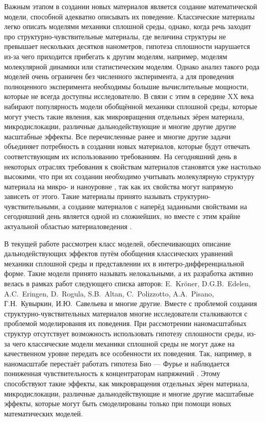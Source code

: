 \ifsynopsis
Важным этапом в создании новых материалов является создание математической модели, способной адекватно описывать их поведение. Классические материалы легко описать моделями механики сплошной среды, однако, когда речь заходит про структурно-чувствительные материалы, где величина структуры не превышает нескольких десятков нанометров, гипотеза сплошности нарушается из-за чего приходится прибегать к другим моделям, например, моделям молекулярной динамики или статистическим моделям. Однако анализ такого рода моделей очень ограничен без численного эксперимента, а для проведения полноценного эксперимента необходимы большие вычислительные мощности, которые не всегда доступны исследователю. В связи с этим в середине XX века набирают популярность модели обобщённой механики сплошной среды, которые могут учесть такие явления, как микровращения отдельных зёрен материала, микродислокации, различные дальнодействующие и многие другие другие масштабные эффекты.
\else
Все перечисленные ранее и многие другие задачи объединяет потребность в создании новых материалов, которые будут отвечать соответствующим их использованию требованиям. На сегодняшний день в некоторых отраслях требования к свойствам материалов становятся уже настолько высокими, что при их создании необходимо учитывать молекулярную структуру материала на микро- и наноуровне \cite{MaterialStructure1, MaterialStructure2, MaterialStructure3}, так как их свойства могут напрямую зависеть от этого. Такие материалы принято называть структурно-чувствительными, а создание материалов с наперёд заданными свойствами на сегодняшний день является одной из сложнейших, но вместе с этим крайне актуальной областью материаловедения \cite{Auxetics}.
\fi

\ifsynopsis
В текущей работе рассмотрен класс моделей, обеспечивающих описание дальнодействующих эффектов путём обобщения классических уравнений механики сплошной среды и представлении их в интегро-дифференциальной форме. Такие модели принято называть нелокальными, а их разработка активно велась в рамках работ следующего списка авторов: E.~Kr{\"o}ner, D.G.B.~Edelen, A.C.~Eringen, D.~Rogula, S.B.~Altan, C.~Polizzotto, A.A.~Pisano, Г.Н.~Кувыркин, И.Ю.~Савельева и многие другие.
\else
Вместе с проблемой создания структурно-чувствительных материалов многие исследователи сталкиваются с проблемой моделирования их поведения. При рассмотрении наномасштабных структур отсутствует возможность использовать гипотезу сплошности среды, из-за чего классические модели механики сплошной среды не могут даже на качественном уровне передать все особенности их поведения. Так, например, в наномасштабе перестаёт работать гипотеза Био --- Фурье \cite{FourierLaw1, FourierLaw2} и наблюдается пониженная чувствительность к концентраторам напряжений \cite{ConcentrationInsensitive1, ConcentrationInsensitive2}. Этому способствуют такие эффекты, как микровращения отдельных зёрен материала, микродислокации, различные дальнодействующие и многие другие масштабные эффекты, которые могут быть смоделированы только при помощи новых математических моделей.
\fi

